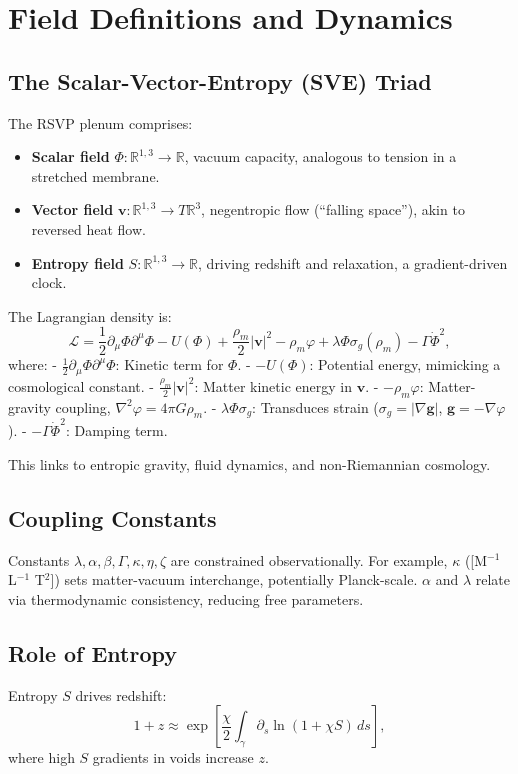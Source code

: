 \documentclass[11pt]{article}
\theoremstyle{plain}
\theoremstyle{definition}
\begin{document}
\section{Field Definitions and Dynamics}
\subsection{The Scalar-Vector-Entropy (SVE) Triad}
The RSVP plenum comprises:
\begin{itemize}
    \item \textbf{Scalar field} $\Phi: \mathbb{R}^{1,3} \to \mathbb{R}$, vacuum capacity, analogous to tension in a stretched membrane.
    \item \textbf{Vector field} $\bm{v}: \mathbb{R}^{1,3} \to T\mathbb{R}^3$, negentropic flow (“falling space”), akin to reversed heat flow.
    \item \textbf{Entropy field} $S: \mathbb{R}^{1,3} \to \mathbb{R}$, driving redshift and relaxation, a gradient-driven clock.
\end{itemize}
The Lagrangian density is:
\begin{equation}
\mathcal{L} = \frac{1}{2} \partial_\mu \Phi \partial^\mu \Phi - U(\Phi) + \frac{\rho_m}{2} |\bm{v}|^2 - \rho_m \varphi + \lambda \Phi \sigma_g(\rho_m) - \Gamma \dot{\Phi}^2,
\label{eq:L}
\end{equation}
where:
- $\frac{1}{2} \partial_\mu \Phi \partial^\mu \Phi$: Kinetic term for $\Phi$.
- $-U(\Phi)$: Potential energy, mimicking a cosmological constant.
- $\frac{\rho_m}{2} |\bm{v}|^2$: Matter kinetic energy in $\bm{v}$.
- $-\rho_m \varphi$: Matter-gravity coupling, $\nabla^2 \varphi = 4\pi G \rho_m$.
- $\lambda \Phi \sigma_g$: Transduces strain ($\sigma_g = |\nabla \bm{g}|$, $\bm{g} = -\nabla \varphi$).
- $-\Gamma \dot{\Phi}^2$: Damping term.

This links to entropic gravity, fluid dynamics, and non-Riemannian cosmology.

\subsection{Coupling Constants}
Constants $\lambda, \alpha, \beta, \Gamma, \kappa, \eta, \zeta$ are constrained observationally. For example, $\kappa$ ([M$^{-1}$ L$^{-1}$ T$^2$]) sets matter-vacuum interchange, potentially Planck-scale. $\alpha$ and $\lambda$ relate via thermodynamic consistency, reducing free parameters.

\subsection{Role of Entropy}
Entropy $S$ drives redshift:
\begin{equation}
1 + z \approx \exp\left[\frac{\chi}{2} \int_\gamma \partial_s \ln(1 + \chi S) \, ds\right],
\label{eq:redshift}
\end{equation}
where high $S$ gradients in voids increase $z$.
\end{document}

